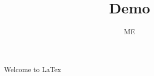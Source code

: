 \documentclass[10pt,a4paper]{article}
\title{Demo}
\author{ME}
\begin{document}
	\maketitle
	Welcome to LaTex
\end{document}
